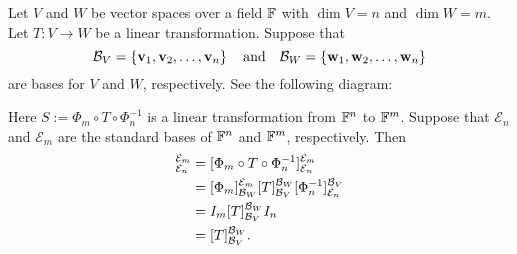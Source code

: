 \documentclass[11pt,openany]{article}
\renewcommand{\vec}[1]{\mathbf{#1}}
\begin{document}
\begin{observation}
Let $V$ and $W$ be vector spaces over a field $\mathbb{F}$ with $\dim V=n$ and $\dim W=m$. Let $T:V\to W$ be a linear transformation. Suppose that \[
\basis_V=\set{\vec{v}_1,\vec{v}_2,\dots,\vec{v}_n}\quad\text{and}\quad\basis_W=\set{\vec{w}_1,\vec{w}_2,\dots,\vec{w}_n}
\] are bases for $V$ and $W$, respectively. See the following diagram:
\begin{center}
\end{center} Here $S:=\Phi_m\circ T\circ \Phi_n^{-1}$ is a linear transformation from $\mathbb{F}^n$ to $\mathbb{F}^m$. Suppose that $\mathcal{E}_n$ and $\mathcal{E}_m$ are the standard bases of $\mathbb{F}^n$ and $\mathbb{F}^m$, respectively. Then \begin{align*}
[S]_{\mathcal{E}_n}^{\mathcal{E}_m} &= [\Phi_m\circ T\circ \Phi_n^{-1}]_{\mathcal{E}_n}^{\mathcal{E}_m}\\
&=[\Phi_m]_{\basis_W}^{\mathcal{E}_m}[T]_{\basis_V}^{\basis_W}[\Phi_n^{-1}]_{\mathcal{E}_n}^{\basis_V}\\
&=I_m[T]_{\basis_V}^{\basis_W}I_n\\
&=[T]_{\basis_V}^{\basis_W}.
\end{align*}
\end{observation}
\end{document}

